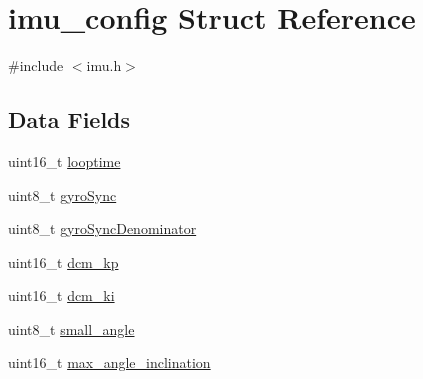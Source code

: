 \hypertarget{structimu__config}{\section{imu\+\_\+config Struct Reference}
\label{structimu__config}
}


{\ttfamily \#include $<$imu.\+h$>$}

\subsection*{Data Fields}
\begin{DoxyCompactItemize}
\item 
uint16\+\_\+t \hyperlink{structimu__config_aa5d7a7731eba81f81432f69d0569f839}{looptime}
\item 
uint8\+\_\+t \hyperlink{structimu__config_a3d6166552e4f2074be6634b4036d6101}{gyro\+Sync}
\item 
uint8\+\_\+t \hyperlink{structimu__config_ad73b17111bcfa72dfb6b339923757386}{gyro\+Sync\+Denominator}
\item 
uint16\+\_\+t \hyperlink{structimu__config_abf09e7444eb000d10d9ba9a63574f396}{dcm\+\_\+kp}
\item 
uint16\+\_\+t \hyperlink{structimu__config_abcb1aa0b81bdbb4743d5595b96d200e6}{dcm\+\_\+ki}
\item 
uint8\+\_\+t \hyperlink{structimu__config_a32e3ee0909d545a8f9db86415346e865}{small\+\_\+angle}
\item 
uint16\+\_\+t \hyperlink{structimu__config_a270438820e28e7bccc465c5d3b771f7e}{max\+\_\+angle\+\_\+inclination}
\end{DoxyCompactItemize}


